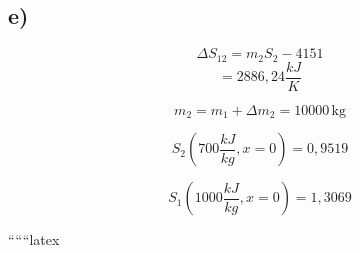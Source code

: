 

\subsection*{e)}

\[
\Delta S_{12} = m_2 S_2 - 4151
\]
\[
= 2886,24 \frac{kJ}{K}
\]

\[
m_2 = m_1 + \Delta m_2 = 10000 \, \text{kg}
\]

\[
S_2 \left( 700 \frac{kJ}{kg}, x=0 \right) = 0,9519
\]

\[
S_1 \left( 1000 \frac{kJ}{kg}, x=0 \right) = 1,3069
\]

``````latex